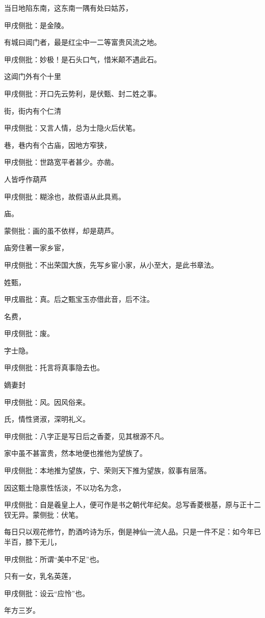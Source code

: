 \begin{parag}
    当日地陷东南，这东南一隅有处曰姑苏，\begin{note}甲戌侧批：是金陵。\end{note}有城曰阊门者，最是红尘中一二等富贵风流之地。\begin{note}甲戌侧批：妙极！是石头口气，惜米颠不遇此石。\end{note}这阊门外有个十里\begin{note}甲戌侧批：开口先云势利，是伏甄、封二姓之事。\end{note}街，街内有个仁清\begin{note}甲戌侧批：又言人情，总为士隐火后伏笔。\end{note}巷，巷内有个古庙，因地方窄狭，\begin{note}甲戌侧批：世路宽平者甚少。亦凿。\end{note}人皆呼作葫芦\begin{note}甲戌侧批：糊涂也，故假语从此具焉。\end{note}庙。\begin{note}蒙侧批：画的虽不依样，却是葫芦。\end{note}庙旁住著一家乡宦，\begin{note}甲戌侧批：不出荣国大族，先写乡宦小家，从小至大，是此书章法。\end{note}姓甄，\begin{note}甲戌眉批：真。后之甄宝玉亦借此音，后不注。\end{note}名费，\begin{note}甲戌侧批：废。\end{note}字士隐。\begin{note}甲戌侧批：托言将真事隐去也。\end{note}嫡妻封\begin{note}甲戌侧批：风。因风俗来。\end{note}氏，情性贤淑，深明礼义。\begin{note}甲戌侧批：八字正是写日后之香菱，见其根源不凡。\end{note}家中虽不甚富贵，然本地便也推他为望族了。\begin{note}甲戌侧批：本地推为望族，宁、荣则天下推为望族，叙事有层落。\end{note}因这甄士隐禀性恬淡，不以功名为念，\begin{note}甲戌侧批：自是羲皇上人，便可作是书之朝代年纪矣。总写香菱根基，原与正十二钗无异。蒙侧批：伏笔。\end{note}每日只以观花修竹，酌酒吟诗为乐，倒是神仙一流人品。只是一件不足：如今年已半百，膝下无儿，\begin{note}甲戌侧批：所谓“美中不足”也。\end{note}只有一女，乳名英莲，\begin{note}甲戌侧批：设云“应怜”也。\end{note}年方三岁。
\end{parag}



